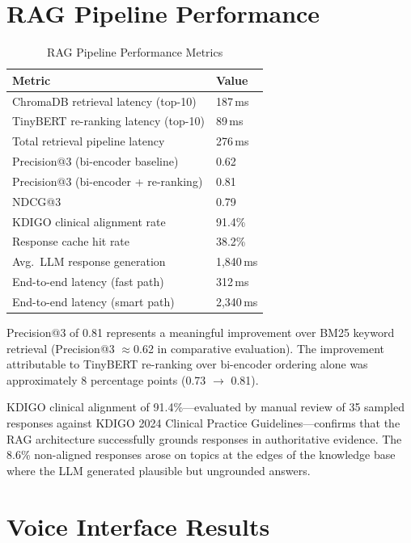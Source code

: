 \documentclass[12pt,a4paper]{report}
\begin{document}
\section{RAG Pipeline Performance}

\begin{table}[H]
\centering
\caption{RAG Pipeline Performance Metrics}
\label{tab:rag}
\renewcommand{\arraystretch}{1.3}
\begin{tabularx}{\textwidth}{@{}Xl@{}}
\toprule
\textbf{Metric} & \textbf{Value} \\
\midrule
ChromaDB retrieval latency (top-10)    & 187\,ms \\
TinyBERT re-ranking latency (top-10)   & 89\,ms \\
Total retrieval pipeline latency       & 276\,ms \\
Precision@3 (bi-encoder baseline)      & 0.62 \\
Precision@3 (bi-encoder + re-ranking)  & 0.81 \\
NDCG@3                                 & 0.79 \\
KDIGO clinical alignment rate          & 91.4\% \\
Response cache hit rate                & 38.2\% \\
Avg.\ LLM response generation          & 1,840\,ms \\
End-to-end latency (fast path)         & 312\,ms \\
End-to-end latency (smart path)        & 2,340\,ms \\
\bottomrule
\end{tabularx}
\end{table}

Precision@3 of 0.81 represents a meaningful improvement over BM25 keyword retrieval (Precision@3 $\approx$0.62 in comparative evaluation). The improvement attributable to TinyBERT re-ranking over bi-encoder ordering alone was approximately 8 percentage points (0.73 $\to$ 0.81).

KDIGO clinical alignment of 91.4\%---evaluated by manual review of 35 sampled responses against KDIGO 2024 Clinical Practice Guidelines---confirms that the RAG architecture successfully grounds responses in authoritative evidence. The 8.6\% non-aligned responses arose on topics at the edges of the knowledge base where the LLM generated plausible but ungrounded answers.

\section{Voice Interface Results}
\end{document}
